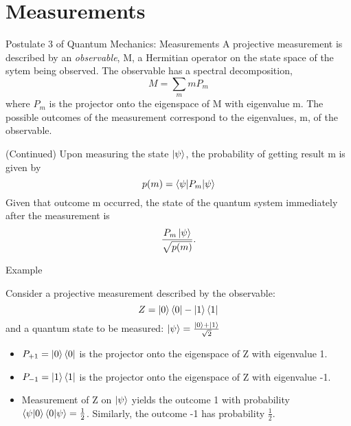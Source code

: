 \documentclass[handout, 10 pt]{beamer}
\begin{document}
\section{Measurements}
\begin{frame}{Postulate 3 of Quantum Mechanics: Measurements}
    A projective measurement is described by an \textit{observable}, M, a Hermitian operator on the state space of the sytem being observed. The observable has a spectral decomposition,
    \begin{equation}
        M=\sum_m m P_m
    \end{equation}
    where $P_m$ is the projector onto the eigenspace of M with eigenvalue m. The possible outcomes of the measurement correspond to the eigenvalues, m, of the observable.
\end{frame}

\begin{frame}{(Continued)}
    Upon measuring the state $\ket{\psi}$, the probability of getting result m is given by 
    \begin{equation}
        p(m)=\braket{\psi|P_m|\psi}
    \end{equation}
    Given that outcome m occurred, the state of the quantum system immediately after the measurement is 
    \begin{equation}
        \frac{P_m \ket{\psi}}{\sqrt{p(m)}}.
    \end{equation}
\end{frame}
\begin{frame}{Example}
\begin{block}{}
    Consider a projective measurement described by the observable: \begin{equation}
    Z=\ket{0}\bra{0}-\ket{1}\bra{1}
    \end{equation}
    and a quantum state to be measured:
        $\ket{\psi}=\frac{\ket{0}+\ket{1}}{\sqrt{2}}$
\end{block}
\pause
\begin{itemize}
    \item $P_{+1}=\ket{0}\bra{0}$ is the projector onto the eigenspace of Z with eigenvalue 1.
    \pause
    \item $P_{-1}=\ket{1}\bra{1}$ is the projector onto the eigenspace of Z with eigenvalue -1.
    \pause
    \item Measurement of Z on $\ket{\psi}$ yields the outcome 1 with probability $\braket{\psi|0}\braket{0|\psi}=\frac{1}{2}$. Similarly, the outcome -1 has probability $\frac{1}{2}$.
\end{itemize}
\end{frame}
\end{document}
